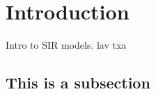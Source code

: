\section{Introduction}\label{Introduction}\thispagestyle{SectionFirstPage} %
Intro to SIR models.
lav txa

\subsection{This is a subsection}
